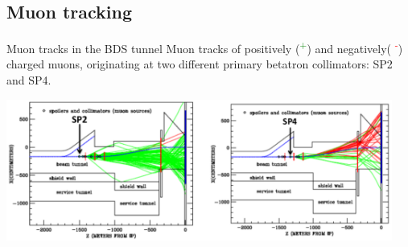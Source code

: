\documentclass[xcolor={dvipsnames}]{beamer}
\begin{document}
\subsection{Muon tracking}
\begin{frame}{Muon tracks in the BDS tunnel}
Muon tracks of positively (\textcolor{green}{\textmu\textsuperscript{+}}) and negatively( \textcolor{red}{\textmu\textsuperscript{-}}) charged muons, originating at two different primary betatron collimators: SP2 and SP4.
\begin{center}
\includegraphics[width=0.95\textwidth]{Muon_tracks.pdf}
\end{center}
\end{frame}
\end{document}
